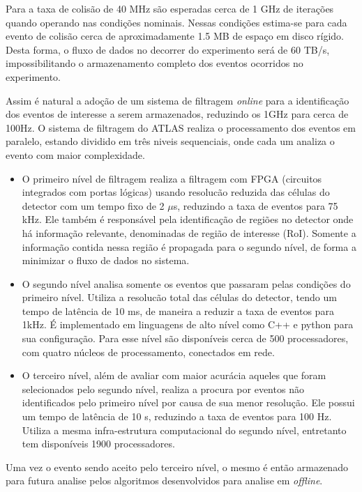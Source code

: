Para a taxa de colisão de 40 MHz são esperadas cerca de 1 GHz de iterações quando
operando nas condições nominais. Nessas condições estima-se para cada evento de colisão 
cerca de aproximadamente 1.5 MB de espaço em disco rígido. Desta forma, 
o fluxo de dados no decorrer do experimento será de 60 TB/s, impossibilitando o
armazenamento completo dos eventos ocorridos no experimento. 

Assim é natural a adoção de um sistema de filtragem {\it online} para a
identificação dos eventos de interesse a serem armazenados, reduzindo os 1GHz
para cerca de 100Hz. O sistema de filtragem do ATLAS realiza o processamento dos 
eventos em paralelo, estando dividido em três niveis sequenciais, onde cada um 
analiza o evento com maior complexidade.

\begin{itemize}
\item O primeiro nível de filtragem realiza a filtragem com FPGA (circuitos
integrados com portas lógicas) usando resolucão reduzida das células do detector
com um tempo fixo de 2 $\mu$s, reduzindo a taxa de eventos para
75 kHz. Ele também é responsável pela identificação de regiões no detector onde
há informação relevante, denominadas de região de interesse (RoI). Somente a
informação contida nessa região é propagada para o segundo nível, de forma a
minimizar o fluxo de dados no sistema.
\item O segundo nível analisa somente os eventos que passaram pelas condições do
primeiro nível. Utiliza a resolucão total das células do detector, 
tendo um tempo de latência de 10 ms, de maneira a reduzir a taxa de eventos para
1kHz. É implementado em linguagens de alto nível como C++ e python para sua configuração. 
Para esse nível são disponíveis cerca de 500 processadores, com quatro
núcleos de processamento, conectados em rede.
\item O terceiro nível, além de avaliar com maior acurácia aqueles que foram
selecionados pelo segundo nível, realiza a procura por eventos não identificados pelo
primeiro nível por causa de sua menor resolução. Ele possui um tempo de 
latência de 10 s, reduzindo a taxa de eventos para 100 Hz. Utiliza a mesma
infra-estrutura computacional do segundo nível, entretanto tem disponíveis 1900 processadores.
\end{itemize}

Uma vez o evento sendo aceito pelo terceiro nível, o mesmo é então armazenado
para futura analise pelos algoritmos desenvolvidos para analise em {\it
offline}.

